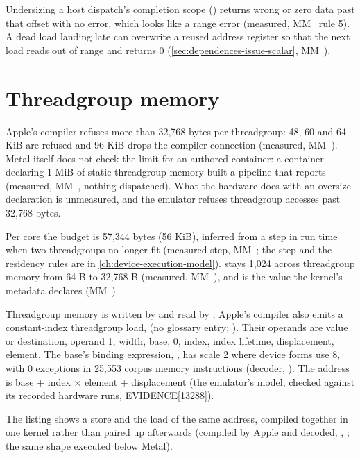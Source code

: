 Undersizing a host dispatch's completion scope ()
returns wrong or zero data past that offset with no error, which looks like a range error (measured, MM~ rule 5). A dead load landing late can
overwrite a reused address register so that the next load reads out of range and returns 0 (\cref{sec:dependences-issue-scalar}, MM~).

\section{Threadgroup memory}\label{sec:threadgroup-memory}

Apple's compiler refuses more than 32,768 bytes per threadgroup: 48, 60 and 64 KiB are refused and 96 KiB drops the
compiler connection (measured, MM~). Metal itself does not check the limit for an authored container: a container
declaring 1 MiB of static threadgroup memory built a pipeline that reports 
(measured, MM~, nothing dispatched). What the hardware does with an oversize declaration is unmeasured, and
the emulator refuses threadgroup accesses past 32,768 bytes.

Per core the budget is 57,344 bytes (56 KiB), inferred from a step in run time when two threadgroups no longer fit
(measured step, MM~; the step and the residency rules are in \cref{ch:device-execution-model}).
 stays 1,024 across threadgroup memory from 64 B to 32,768 B (measured, MM~),
and  is the value the kernel's metadata declares (MM~).

Threadgroup memory is written by  and read by ; Apple's compiler also emits a constant-index threadgroup
load,  (no glossary entry; ). Their operands are value or
destination, operand 1, width, base, 0, index, index lifetime, displacement, element. The base's binding expression,
, has scale 2 where device forms use 8, with 0 exceptions in 25,553 corpus memory instructions
(decoder, ). The address is base + index $\times$ element + displacement (the emulator's model,
checked against its recorded hardware runs,  EVIDENCE{[}13288{]}).

The listing shows a store and the load of the same address, compiled together in one kernel rather than paired up
afterwards (compiled by Apple and decoded,
, ; the same shape executed below Metal).

